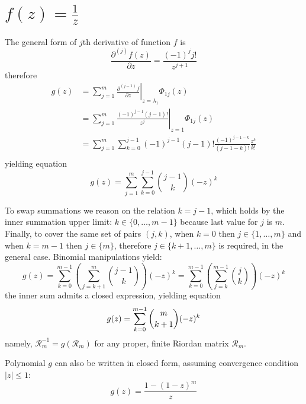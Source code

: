 \section{$f(z)=\frac{1}{z}$}

The general form of $j$th derivative of function $f$ is 
$$\frac{\partial^{(j)}{f}(z)}{\partial{z}} = \frac{(-1)^{j}j!}{z^{j+1}}$$ 
therefore
\begin{displaymath}
\begin{split}
  g(z) &= \sum_{j=1}^{m}{ \left. \frac{\partial^{(j-1)}{f}}{\partial{z}} \right|_{z=\lambda_{1}}\Phi_{1j}(z)} \\
       &= \sum_{j=1}^{m}{ \left. \frac{(-1)^{j-1}(j-1)!}{z^{j}} \right|_{z=1}\Phi_{1j}(z)} \\
       &= \sum_{j=1}^{m}{\sum_{k=0}^{j-1}{(-1)^{j-1}(j-1)!\frac{(-1)^{j-1-k}}{(j-1-k)!}\frac{z^{k}}{k!}}} \\
\end{split}
\end{displaymath}
yielding equation
\begin{equation}
  g(z) = \sum_{j=1}^{m}{\sum_{k=0}^{j-1}{{{j-1}\choose{k}}(-z)^{k}}} 
\end{equation}

To swap summations we reason on the relation $k=j-1$, which holds by the inner summation upper limit:
$k\in \lbrace 0,\ldots,m-1 \rbrace$ because last value for $j$ is $m$. Finally, to cover the same set 
of pairs $(j, k)$, when $k=0$ then $j\in \lbrace 1,\ldots,m \rbrace$ and when $k=m-1$ then 
$j\in \lbrace m \rbrace$, therefore $j\in \lbrace k+1, \ldots, m \rbrace$ is required, in the general case.
Binomial manipulations yield:
\begin{displaymath}
  g(z) = \sum_{k=0}^{m-1}{\left(\sum_{j=k+1}^{m}{{{j-1}\choose{k}}}\right)(-z)^{k}}
       = \sum_{k=0}^{m-1}{\left(\sum_{j=k}^{m-1}{{{j}\choose{k}}}\right)(-z)^{k}}
\end{displaymath}
the inner sum admits a closed expression, yielding equation
\begin{equation}
  g(z) = \sum_{k=0}^{m-1}{{{m}\choose{k+1}}(-z)^{k}} \\
\end{equation}
namely, $\mathcal{R}_{m}^{-1}=g(\mathcal{R}_{m})$ for any proper, finite Riordan matrix $\mathcal{R}_{m}$.

Polynomial $g$ can also be written in closed form, assuming convergence condition $|z|\leq 1$:
\begin{displaymath}
g(z) = \frac{1- \left(1- z \right)^{m} }{z}
\end{displaymath}

